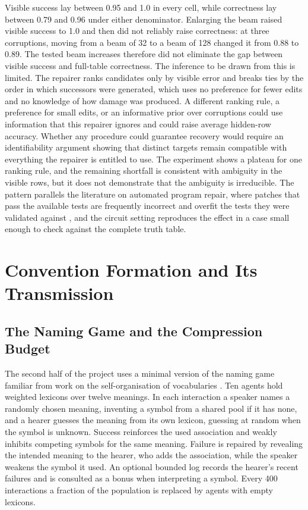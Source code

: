 \documentclass[11pt]{article}
\begin{document}
Visible success lay between 0.95 and 1.0 in every cell, while correctness lay between 0.79 and 0.96 under either denominator. Enlarging the beam raised visible success to 1.0 and then did not reliably raise correctness: at three corruptions, moving from a beam of 32 to a beam of 128 changed it from 0.88 to 0.89. The tested beam increases therefore did not eliminate the gap between visible success and full-table correctness. The inference to be drawn from this is limited. The repairer ranks candidates only by visible error and breaks ties by the order in which successors were generated, which uses no preference for fewer edits and no knowledge of how damage was produced. A different ranking rule, a preference for small edits, or an informative prior over corruptions could use information that this repairer ignores and could raise average hidden-row accuracy. Whether any procedure could guarantee recovery would require an identifiability argument showing that distinct targets remain compatible with everything the repairer is entitled to use. The experiment shows a plateau for one ranking rule, and the remaining shortfall is consistent with ambiguity in the visible rows, but it does not demonstrate that the ambiguity is irreducible. The pattern parallels the literature on automated program repair, where patches that pass the available tests are frequently incorrect and overfit the tests they were validated against \cite{legoues2012genprog,qi2015plausibility,smith2015overfitting}, and the circuit setting reproduces the effect in a case small enough to check against the complete truth table.

\section{Convention Formation and Its Transmission}

\subsection{The Naming Game and the Compression Budget}

The second half of the project uses a minimal version of the naming game familiar from work on the self-organisation of vocabularies \cite{steels1995spatial,baronchelli2006sharp}. Ten agents hold weighted lexicons over twelve meanings. In each interaction a speaker names a randomly chosen meaning, inventing a symbol from a shared pool if it has none, and a hearer guesses the meaning from its own lexicon, guessing at random when the symbol is unknown. Success reinforces the used association and weakly inhibits competing symbols for the same meaning. Failure is repaired by revealing the intended meaning to the hearer, who adds the association, while the speaker weakens the symbol it used. An optional bounded log records the hearer's recent failures and is consulted as a bonus when interpreting a symbol. Every 400 interactions a fraction of the population is replaced by agents with empty lexicons.
\end{document}
